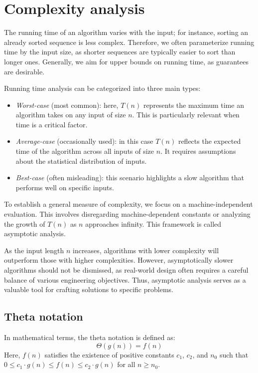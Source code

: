 \section{Complexity analysis}

The running time of an algorithm varies with the input; for instance, sorting an already sorted sequence is less complex. 
Therefore, we often parameterize running time by the input size, as shorter sequences are typically easier to sort than longer ones. 
Generally, we aim for upper bounds on running time, as guarantees are desirable.

Running time analysis can be categorized into three main types:
\begin{itemize}
    \item \textit{Worst-case} (most common): here, $T(n)$ represents the maximum time an algorithm takes on any input of size $n$. 
    This is particularly relevant when time is a critical factor.
    \item \textit{Average-case} (occasionally used): in this case $T(n)$ reflects the expected time of the algorithm across all inputs of size $n$. 
    It requires assumptions about the statistical distribution of inputs.
    \item \textit{Best-case} (often misleading): this scenario highlights a slow algorithm that performs well on specific inputs.
\end{itemize}
To establish a general measure of complexity, we focus on a machine-independent evaluation.
This involves disregarding machine-dependent constants or analyzing the growth of $T(n)$ as $n$ approaches infinity.
This framework is called asymptotic analysis. 

As the input length $n$ increases, algorithms with lower complexity will outperform those with higher complexities. 
However, asymptotically slower algorithms should not be dismissed, as real-world design often requires a careful balance of various engineering objectives. 
Thus, asymptotic analysis serves as a valuable tool for crafting solutions to specific problems.

\subsection{Theta notation}
In mathematical terms, the theta notation is defined as:
\[\Theta\left(g(n)\right)=f(n)\]
Here, $f(n)$ satisfies the existence of positive constants $c_1$, $c_2$, and $n_0$ such that $0 \leq c_1 \cdot g(n) \leq f (n) \leq c_2 \cdot g(n)$ for all $n \geq n_0$. 

